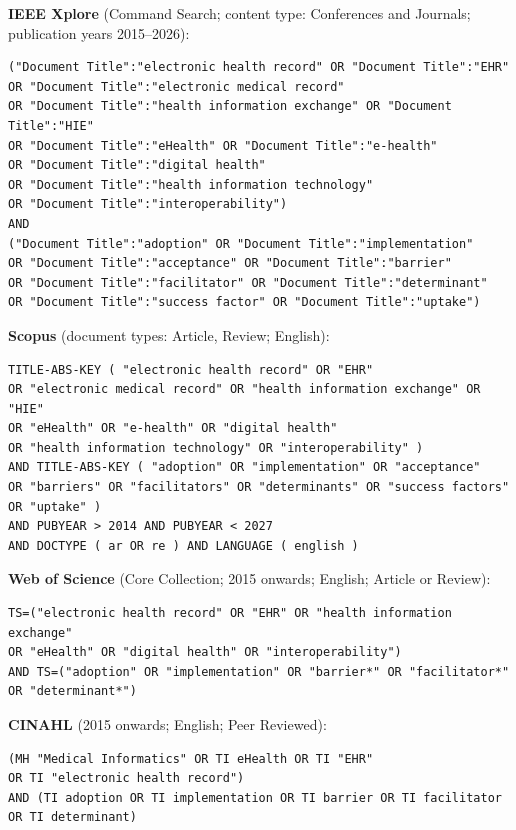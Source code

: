 \medskip
\noindent\textbf{IEEE Xplore} (Command Search; content type: Conferences and
Journals; publication years 2015--2026): \\
{\footnotesize\begin{verbatim}
("Document Title":"electronic health record" OR "Document Title":"EHR"
OR "Document Title":"electronic medical record"
OR "Document Title":"health information exchange" OR "Document Title":"HIE"
OR "Document Title":"eHealth" OR "Document Title":"e-health"
OR "Document Title":"digital health"
OR "Document Title":"health information technology"
OR "Document Title":"interoperability")
AND
("Document Title":"adoption" OR "Document Title":"implementation"
OR "Document Title":"acceptance" OR "Document Title":"barrier"
OR "Document Title":"facilitator" OR "Document Title":"determinant"
OR "Document Title":"success factor" OR "Document Title":"uptake")
\end{verbatim}}

\medskip
\noindent\textbf{Scopus} (document types: Article, Review; English): \\
{\footnotesize\begin{verbatim}
TITLE-ABS-KEY ( "electronic health record" OR "EHR"
OR "electronic medical record" OR "health information exchange" OR "HIE"
OR "eHealth" OR "e-health" OR "digital health"
OR "health information technology" OR "interoperability" )
AND TITLE-ABS-KEY ( "adoption" OR "implementation" OR "acceptance"
OR "barriers" OR "facilitators" OR "determinants" OR "success factors"
OR "uptake" )
AND PUBYEAR > 2014 AND PUBYEAR < 2027
AND DOCTYPE ( ar OR re ) AND LANGUAGE ( english )
\end{verbatim}}

\medskip
\noindent\textbf{Web of Science} (Core Collection; 2015 onwards; English; Article or Review): \\
{\footnotesize\begin{verbatim}
TS=("electronic health record" OR "EHR" OR "health information exchange"
OR "eHealth" OR "digital health" OR "interoperability")
AND TS=("adoption" OR "implementation" OR "barrier*" OR "facilitator*"
OR "determinant*")
\end{verbatim}}

\medskip
\noindent\textbf{CINAHL} (2015 onwards; English; Peer Reviewed): \\
{\footnotesize\begin{verbatim}
(MH "Medical Informatics" OR TI eHealth OR TI "EHR"
OR TI "electronic health record")
AND (TI adoption OR TI implementation OR TI barrier OR TI facilitator
OR TI determinant)
\end{verbatim}}

